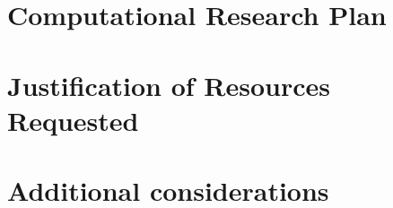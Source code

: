 \documentclass[a4paper, 10pt, notitlepage]{nsf}
\begin{document}
\section{Computational Research Plan}
\label{sec:research_plan}

\section{Justification of Resources Requested}

\section{Additional considerations}


%
\newpage


\end{document}
